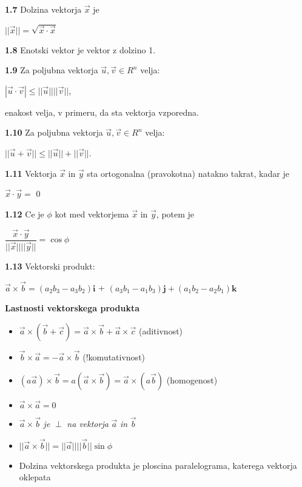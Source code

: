 \documentclass{article}
\begin{document}
\begin{multicols}{3}
\textbf{1.7} Dolzina vektorja $\vec{x}$ je
\begin{center}
    $||\vec{x}|| = \sqrt{\vec{x} \cdot \vec{x}}$
\end{center}

\textbf{1.8} Enotski vektor je vektor z dolzino 1.

\textbf{1.9} Za poljubna vektorja $\vec{u}, \vec{v} \in R^{n}$ velja:
\begin{center}
    $|\vec{u} \cdot \vec{v}| \leq ||\vec{u}||||\vec{v}||$,
\end{center}
enakost velja, v primeru, da sta vektorja vzporedna.


\textbf{1.10} Za poljubna vektorja $\vec{u}, \vec{v} \in R^{n}$ velja:
\begin{center}
    $||\vec{u} + \vec{v}|| \leq ||\vec{u}||+||\vec{v}||$.
\end{center}

\textbf{1.11} Vektorja $\vec{x}$ in $\vec{y}$ sta ortogonalna
(pravokotna) natakno takrat, kadar je
\begin{center}
    $\vec{x} \cdot \vec{y} = $ 0    
\end{center}

\textbf{1.12} Ce je $\phi$ kot med vektorjema $\vec{x}$ in $\vec{y}$, potem je
\begin{center}
    $\dfrac{\vec{x} \cdot \vec{y}}{||\vec{x}|| ||\vec{y}||} =
    \cos \phi$
\end{center}

\textbf{1.13} Vektorski produkt:
\begin{center}
    $\vec{a} \times \vec{b} = (a_{2}b_{3} - a_{3}b_{2}) \textbf{i}$ +
    $(a_{3}b_{1} - a_{1}b_{3}) \textbf{j} + (a_{1}b_{2} - a_{2}b_{1}) \textbf{k}$
\end{center}

\textbf{Lastnosti vektorskega produkta}
\begin{itemize}
    \item $\vec{a} \times (\vec{b} + \vec{c}) = \vec{a} \times \vec{b} + \vec{a} \times \vec{c}$ (aditivnost)
    \item $\vec{b} \times \vec{a} = -\vec{a} \times \vec{b}$ (!komutativnost)
    \item $ (a \vec{a}) \times \vec{b} = a(\vec{a} \times \vec{b}) =  \vec{a} \times (a \vec{b})$ (homogenost)
    \item $\vec{a} \times \vec{a} = 0$
    \item $\vec{a} \times \vec{b}$  \textit{je}  $\perp$ \textit{na vektorja} $\vec{a}$ \textit{in} $\vec{b}$
    \item $||\vec{a} \times \vec{b}|| = ||\vec{a}|| ||\vec{b}|| \sin \phi$
    \item Dolzina vektorskega produkta je ploscina paralelograma, katerega vektorja oklepata 
\end{itemize}


\end{multicols}
\end{document}
